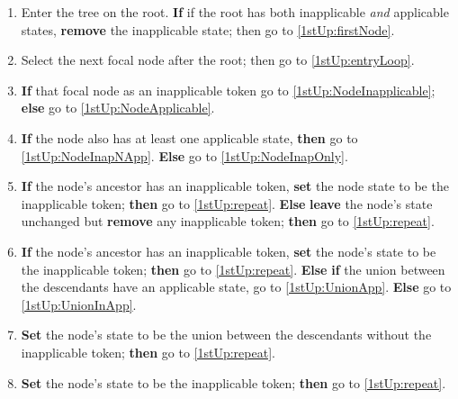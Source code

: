 \documentclass[a4paper,12pt]{article}
\begin{document}
\begin{enumerate}
    \item Enter the tree on the root. \textbf{If} if the root has both inapplicable \textit{and} applicable states, \textbf{remove} the inapplicable state; then go to \ref{1stUp:firstNode}.
    \item \label{1stUp:firstNode} Select the next focal node after the root; then go to \ref{1stUp:entryLoop}. 
    \item \label{1stUp:entryLoop} \textbf{If} that focal node as an inapplicable token go to \ref{1stUp:NodeInapplicable}; \textbf{else} go to \ref{1stUp:NodeApplicable}.
    \item \label{1stUp:NodeInapplicable} \textbf{If} the node also has at least one applicable state, \textbf{then} go to \ref{1stUp:NodeInapNApp}. \textbf{Else} go to \ref{1stUp:NodeInapOnly}.
    \item \label{1stUp:NodeInapNApp} \textbf{If} the node's ancestor has an inapplicable token, \textbf{set} the node state to be the inapplicable token; \textbf{then} go to \ref{1stUp:repeat}. \textbf{Else} \textbf{leave} the node's state unchanged but \textbf{remove} any inapplicable token; \textbf{then} go to \ref{1stUp:repeat}.
    \item \label{1stUp:NodeInapOnly} \textbf{If} the node's ancestor has an inapplicable token, \textbf{set} the node's state to be the inapplicable token; \textbf{then} go to \ref{1stUp:repeat}. \textbf{Else} \textbf{if} the union between the descendants have an applicable state, go to \ref{1stUp:UnionApp}. \textbf{Else} go to \ref{1stUp:UnionInApp}.
    \item \label{1stUp:UnionApp} \textbf{Set} the node's state to be the union between the descendants without the inapplicable token; \textbf{then} go to \ref{1stUp:repeat}.
    \item \label{1stUp:UnionInApp} \textbf{Set} the node's state to be the inapplicable token; \textbf{then} go to \ref{1stUp:repeat}.

\end{enumerate}
\end{document}
